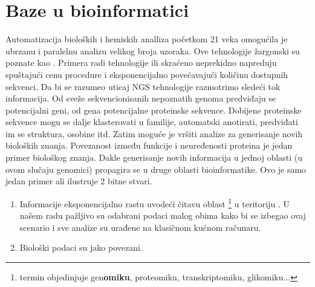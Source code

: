 \chapter{Baze u bioinformatici} %

\label{Baze} %




Automatizacija bioloških i hemiskih analliza početkom 21 veka omogućila je
ubrzanu i paralelnu analizu velikog broja uzoraka. Ove tehnologije žargonski su
poznate kao  . Primera radi tehnologije 
 ili skraćeno  neprekidno napreduju
spuštajući cenu procedure i eksponencijalno povećavajući količinu dostupnih
sekvenci. Da bi se razumeo uticaj NGS tehnologije razmotrimo sledeći tok
informacija.  Od sveže sekvencionisanih nepoznatih genoma predviđaju se
potencijalni geni, od gena potencijalne proteinske sekvence.  Dobijene
proteinske sekvence mogu se dalje klasterovati u familije, automatski
anotirati, predviđati im se struktura, osobine itd.  Zatim moguće je vršiti
analize za generisanje novih bioloških znanja. Povezanost između funkcije i
neuređenosti proteina je jedan primer biološkog znanja. Dakle generisanje novih
informacija u jednoj oblasti (u ovom slučaju genomici) propagira se u druge
oblasti bioinformatike. Ovo je samo jedan primer ali ilustruje 2 bitne stvari.
\begin{enumerate}
  \item Informacije eksponencijalno rastu uvodeći čitavu oblast
    \footnote{termin objedinjuje gen\textbf{omiku}, proteomiku,
    transkriptomiku, glikomiku...}   u teritoriju \parencite{Chen2017}. U našem radu pažljivo su odabrani podaci malog
  obima kako bi se izbegao ovaj scenario i sve analize su urađene na klasičnom
  kućnom računaru.
  \item Biološki podaci su jako povezani.
\end{enumerate}

